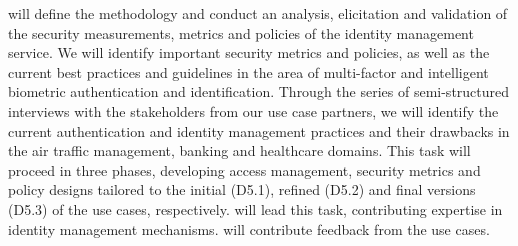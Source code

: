 \begin{Workpackage}{\thewpno}
\begin{WPDescription}
\end{WPDescription}

\begin{Task}
\TaskResults{%
\ref{del:auth1},
\ref{del:auth2},
\ref{del:auth3}
}
\TaskHeader{}

\theTask{} will define the methodology and conduct an analysis, elicitation and validation of the security measurements, metrics and policies of the identity management service. 
We will identify important security metrics and policies, as well as the current best practices and guidelines in the area of multi-factor and intelligent biometric authentication and identification. Through the series of semi-structured interviews with the stakeholders from our use case partners, we will identify the current authentication and identity management practices and their drawbacks in the air traffic management, banking and healthcare domains. This task will proceed in three phases, developing access management, security metrics and policy designs tailored to the initial (D5.1), refined (D5.2) and final versions (D5.3) of the use cases, respectively. \COGNIshort{} will lead this task, contributing expertise in identity management mechanisms. \SOPRAshort{} will contribute feedback from the use cases.
  

\end{Task}
\end{Workpackage}
